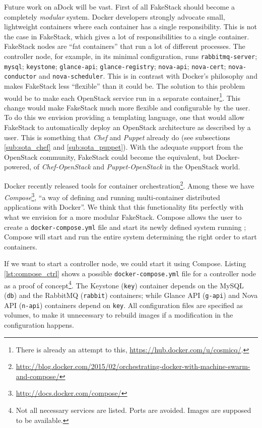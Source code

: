 Future work on aDock will be vast. First of all FakeStack should become a completely \emph{modular} system. Docker developers strongly advocate small, lightweight containers where each container has a single responsibility. This is not the case in FakeStack, which gives a lot of responsibilities to a single container. FakeStack nodes are ``fat containers'' that run a lot of different processes. The controller node, for example, in its minimal configuration, runs \texttt{rabbitmq-server}; \texttt{mysql}; \texttt{keystone}; \texttt{glance-api}; \texttt{glance-registry}; \texttt{nova-api}; \texttt{nova-cert}; \texttt{nova-conductor} and \texttt{nova-scheduler}. This is in contrast with Docker's philosophy and makes FakeStack less ``flexible'' than it could be. The solution to this problem would be to make each OpenStack service run in a separate container\footnote{There is already an attempt to this, \url{https://hub.docker.com/u/cosmicq/}.}. This change would make FakeStack much more flexible and configurable by the user. To do this we envision providing a templating language, one that would allow FakeStack to automatically deploy an OpenStack architecture as described by a user. This is something that \textit{Chef} and \textit{Puppet} already do (see subsections \ref{sub:sota_chef} and \ref{sub:sota_puppet}). With the adequate support from the OpenStack community, FakeStack could become the equivalent, but Docker-powered, of \textit{Chef-OpenStack} and \textit{Puppet-OpenStack} in the OpenStack world.

Docker recently released tools for container orchestration\footnote{\url{http://blog.docker.com/2015/02/orchestrating-docker-with-machine-swarm-and-compose/}}. Among these we have \textit{Compose}\footnote{\url{http://docs.docker.com/compose/}}, ``a way of defining and running multi-container distributed applications with Docker''. We think that this functionality fits perfectly with what we envision for a more modular FakeStack. Compose allows the user to create a \texttt{docker-compose.yml} file and start its newly defined system running ; Compose will start and run the entire system determining the right order to start containers.

If we want to start a controller node, we could start it using Compose. Listing \ref{lst:compose_ctrl} shows a possible \texttt{docker-compose.yml} file for a controller node as a proof of concept\footnote{Not all necessary services are listed. Ports are avoided. Images are supposed to be available.}. The Keystone (\texttt{key}) container depends on the MySQL (\texttt{db}) and the RabbitMQ (\texttt{rabbit}) containers; while Glance API (\texttt{g-api}) and Nova API (\texttt{n-api}) containers depend on \texttt{key}. All configuration files are specified as volumes, to make it unnecessary to rebuild images if a modification in the configuration happens.

